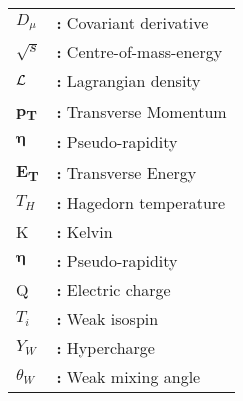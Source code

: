 \begin{tabular}{@{}p{2cm}l}
{$D_\mu$} & {\bf:} Covariant derivative\\
{$\sqrt{s}$} & {\bf:} Centre-of-mass-energy\\
{$\mathcal{L}$} & {\bf:} Lagrangian density\\
{\bf p\textsubscript{T}} & {\bf:} Transverse Momentum\\
{$\boldsymbol\eta$} & {\bf:} Pseudo-rapidity\\
{\bf E\textsubscript{T}} & {\bf:} Transverse Energy\\
{$T_H$} & {\bf:} Hagedorn temperature\\
{K} & {\bf:} Kelvin\\
{$\boldsymbol\eta$} & {\bf:} Pseudo-rapidity\\
{Q} & {\bf:} Electric charge\\
{$T_i$} & {\bf:} Weak isospin\\
{$Y_W$} & {\bf:} Hypercharge\\
{$\theta_W$} & {\bf:} Weak mixing angle\\
\end{tabular}

